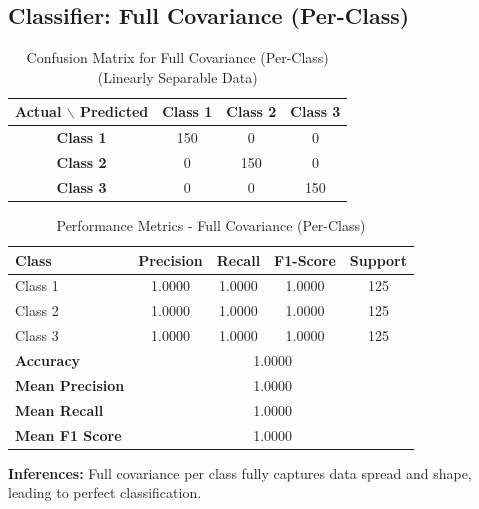 \subsection{Classifier: Full Covariance (Per-Class)}


\begin{table}[H]
\centering
\caption{Confusion Matrix for Full Covariance (Per-Class) (Linearly Separable Data)}
\label{tab:confmat_d3_sigma2I}
\begin{tabular}{|c|c|c|c|}
\hline
\textbf{Actual $\backslash$ Predicted} & \textbf{Class 1} & \textbf{Class 2} & \textbf{Class 3} \\
\hline
\textbf{Class 1} & 150 & 0   & 0   \\
\textbf{Class 2} & 0  & 150 & 0   \\
\textbf{Class 3} & 0   & 0   & 150 \\
\hline
\end{tabular}
\end{table}


\begin{table}[H]
\centering
\caption{Performance Metrics - Full Covariance (Per-Class)}
\begin{tabular}{lcccc}
\toprule
\textbf{Class} & \textbf{Precision} & \textbf{Recall} & \textbf{F1-Score} & \textbf{Support} \\
\midrule
Class 1 & 1.0000 & 1.0000 & 1.0000 & 125 \\
Class 2 & 1.0000 & 1.0000 & 1.0000 & 125 \\
Class 3 & 1.0000 & 1.0000 & 1.0000 & 125 \\
\midrule
\textbf{Accuracy} & \multicolumn{4}{c}{1.0000} \\
\textbf{Mean Precision} & \multicolumn{4}{c}{1.0000} \\
\textbf{Mean Recall} & \multicolumn{4}{c}{1.0000} \\
\textbf{Mean F1 Score} & \multicolumn{4}{c}{1.0000} \\
\bottomrule
\end{tabular}
\end{table}

\textbf{Inferences:} Full covariance per class fully captures data spread and shape, leading to perfect classification.

